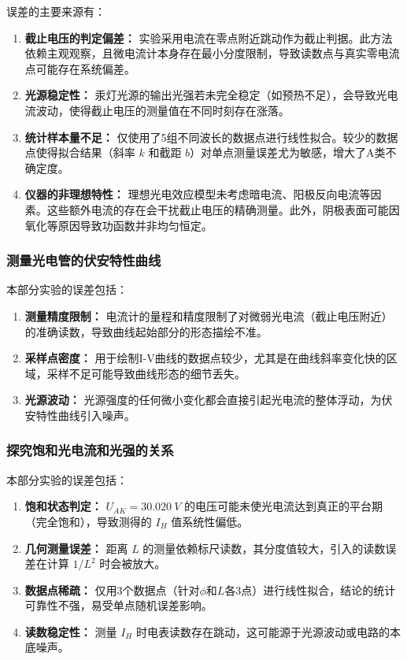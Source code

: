 \documentclass{../template/Report}%
\begin{document}
\begin{fullreportonly}
误差的主要来源有：
\begin{enumerate}
    \item \textbf{截止电压的判定偏差：} 实验采用电流在零点附近跳动作为截止判据。此方法依赖主观观察，且微电流计本身存在最小分度限制，导致读数点与真实零电流点可能存在系统偏差。
    \item \textbf{光源稳定性：} 汞灯光源的输出光强若未完全稳定（如预热不足），会导致光电流波动，使得截止电压的测量值在不同时刻存在涨落。
    \item \textbf{统计样本量不足：} 仅使用了5组不同波长的数据点进行线性拟合。较少的数据点使得拟合结果（斜率 $k$ 和截距 $b$）对单点测量误差尤为敏感，增大了A类不确定度。
    \item \textbf{仪器的非理想特性：} 理想光电效应模型未考虑暗电流、阳极反向电流等因素。这些额外电流的存在会干扰截止电压的精确测量。此外，阴极表面可能因氧化等原因导致功函数并非均匀恒定。
\end{enumerate}

\subsubsection{测量光电管的伏安特性曲线}
本部分实验的误差包括：
\begin{enumerate}
    \item \textbf{测量精度限制：} 电流计的量程和精度限制了对微弱光电流（截止电压附近）的准确读数，导致曲线起始部分的形态描绘不准。
    \item \textbf{采样点密度：} 用于绘制I-V曲线的数据点较少，尤其是在曲线斜率变化快的区域，采样不足可能导致曲线形态的细节丢失。
    \item \textbf{光源波动：} 光源强度的任何微小变化都会直接引起光电流的整体浮动，为伏安特性曲线引入噪声。
\end{enumerate}

\subsubsection{探究饱和光电流和光强的关系}
本部分实验的误差包括：
\begin{enumerate}
    \item \textbf{饱和状态判定：} $U_{AK} = \SI{30.020}{V}$ 的电压可能未使光电流达到真正的平台期（完全饱和），导致测得的 $I_H$ 值系统性偏低。
    \item \textbf{几何测量误差：} 距离 $L$ 的测量依赖标尺读数，其分度值较大，引入的读数误差在计算 $1/L^2$ 时会被放大。
    \item \textbf{数据点稀疏：} 仅用3个数据点（针对$\phi$和$L$各3点）进行线性拟合，结论的统计可靠性不强，易受单点随机误差影响。
    \item \textbf{读数稳定性：} 测量 $I_H$ 时电表读数存在跳动，这可能源于光源波动或电路的本底噪声。
\end{enumerate}


\end{fullreportonly}
\end{document}
